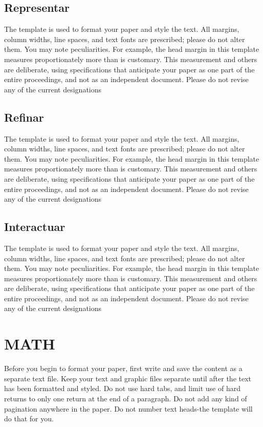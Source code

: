 \documentclass[letterpaper, 12 pt, conference]{ieeeconf}  %
\begin{document}
\subsection{Representar}

The template is used to format your paper and style the text. All margins, column widths, line spaces, and text fonts are prescribed; please do not alter them. You may note peculiarities. For example, the head margin in this template measures proportionately more than is customary. This measurement and others are deliberate, using specifications that anticipate your paper as one part of the entire proceedings, and not as an independent document. Please do not revise any of the current designations

\subsection{Refinar}

The template is used to format your paper and style the text. All margins, column widths, line spaces, and text fonts are prescribed; please do not alter them. You may note peculiarities. For example, the head margin in this template measures proportionately more than is customary. This measurement and others are deliberate, using specifications that anticipate your paper as one part of the entire proceedings, and not as an independent document. Please do not revise any of the current designations

\subsection{Interactuar}

The template is used to format your paper and style the text. All margins, column widths, line spaces, and text fonts are prescribed; please do not alter them. You may note peculiarities. For example, the head margin in this template measures proportionately more than is customary. This measurement and others are deliberate, using specifications that anticipate your paper as one part of the entire proceedings, and not as an independent document. Please do not revise any of the current designations

\section{MATH}

Before you begin to format your paper, first write and save the content as a separate text file. Keep your text and graphic files separate until after the text has been formatted and styled. Do not use hard tabs, and limit use of hard returns to only one return at the end of a paragraph. Do not add any kind of pagination anywhere in the paper. Do not number text heads-the template will do that for you.
\end{document}
